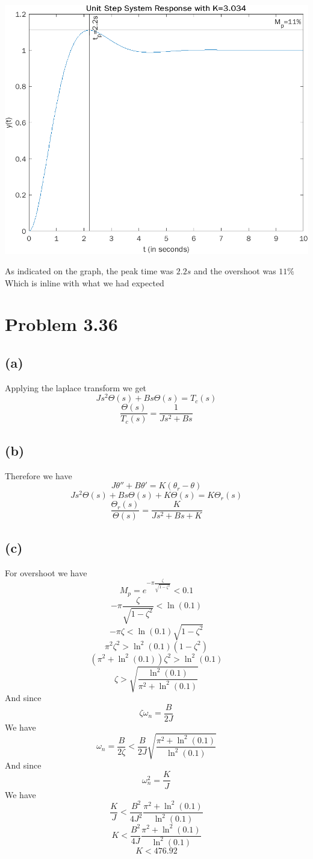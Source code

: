 \documentclass[12pt]{article}
\begin{document}
\includegraphics[scale=.5]{Fig1.png}

As indicated on the graph, the peak time was $2.2s$ and the overshoot was $11\%$
Which is inline with what we had expected
\section*{Problem 3.36}
\subsection*{(a)}
Applying the laplace transform we get
$$Js^2\Theta(s)+Bs\Theta(s)=T_c(s)$$
$$\frac{\Theta(s)}{T_c(s)}=\boxed{\frac{1}{Js^2+Bs}}$$
\subsection*{(b)}
Therefore we have
$$J\theta''+B\theta'=K(\theta_r-\theta)$$
$$Js^2\Theta(s)+Bs\Theta(s)+K\Theta(s)=K\Theta_r(s)$$
$$\frac{\Theta_r(s)}{\Theta(s)}=\boxed{\frac{K}{Js^2+Bs+K}}$$
\subsection*{(c)}
For overshoot we have
$$M_p=e^{-\pi\frac{\zeta}{\sqrt{1-\zeta^2}}}<0.1$$
$$-\pi\frac{\zeta}{\sqrt{1-\zeta^2}}<\ln(0.1)$$
$$-\pi\zeta<\ln(0.1)\sqrt{1-\zeta^2}$$
$$\pi^2\zeta^2>\ln^2(0.1)(1-\zeta^2)$$
$$(\pi^2+\ln^2(0.1))\zeta^2>\ln^2(0.1)$$
$$\zeta>\sqrt{\frac{\ln^2(0.1)}{\pi^2+\ln^2(0.1)}}$$
And since 
$$\zeta\omega_n=\frac{B}{2J}$$
We have
$$\omega_n=\frac{B}{2\zeta}<\frac{B}{2J}\sqrt{\frac{\pi^2+\ln^2(0.1)}{\ln^2(0.1)}}$$
And since
$$\omega_n^2=\frac{K}{J}$$
We have
$$\frac{K}{J}<\frac{B^2}{4J^2}\frac{\pi^2+\ln^2(0.1)}{\ln^2(0.1)}$$
$$K<\frac{B^2}{4J}\frac{\pi^2+\ln^2(0.1)}{\ln^2(0.1)}$$
$$K<476.92$$
\end{document}
